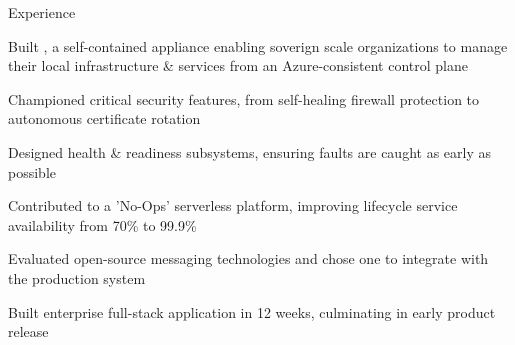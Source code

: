 \documentclass{resume} %
\begin{document}

    \begin{rSection}{Experience}

        \company{\microsoft}{\seattle}
                \begin{rList}
		    \item Built {\aldo}, a self-contained appliance enabling soverign scale organizations to
			manage their local infrastructure \& services from an Azure-consistent
			control plane
		    \item Championed critical security features, from self-healing firewall protection
			to autonomous certificate rotation
		    \item Designed health \& readiness subsystems, ensuring faults
			are caught as early as possible
                \end{rList}
                \begin{rList}
		    \item Contributed to a 'No-Ops' serverless platform, improving lifecycle
			service availability from 70\% to 99.9\%
                \end{rList}
                \begin{rList}
                    \item Evaluated open-source messaging technologies
                        and chose one to integrate with the production system
                \end{rList}
        \vspace{0.5em}


        \company{\lefttravel}{\la}
                \begin{rList}
                    \item Built enterprise full-stack application in 12 weeks, culminating in early
                        product release
                \end{rList}
        \vspace{0.5em}

    \end{rSection}
\end{document}
